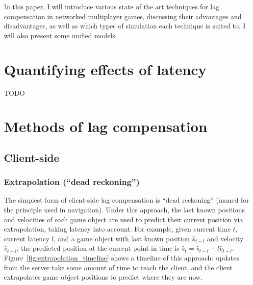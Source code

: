 \documentclass[conference]{IEEEtran}
\begin{document}
	In this paper, I will introduce various state of the art techniques for lag compensation in networked multiplayer games, discussing their advantages and disadvantages, as well as which types of simulation each technique is suited to. I will also present some unified models.

	\section{Quantifying effects of latency}

	TODO \cite{beigbeder2004effects} \cite{chen2011perceptual} \cite{claypool2005effect} \cite{fritsch2005effect} \cite{sheldon2003effect} \cite{quax2004objective} \cite{dick2005analysis}

	\section{Methods of lag compensation}

	\subsection{Client-side}

	\subsubsection{Extrapolation (``dead reckoning'')}

	The simplest form of client-side lag compensation is ``dead reckoning'' (named for the principle used in navigation). Under this approach, the last known positions and velocities of each game object are used to predict their current position via extrapolation, taking latency into account. For example, given current time $t$, current latency $l$, and a game object with last known position $\hat{s}_{t - l}$ and velocity $\hat{v}_{t - l}$, the predicted position at the current point in time is $\hat{s}_{t} = \hat{s}_{t - l} + l\hat{v}_{t - l}$. Figure~\ref{fig:extrapolation_timeline} shows a timeline of this approach: updates from the server take some amount of time to reach the client, and the client extrapolates game object positions to predict where they are now.
\end{document}
